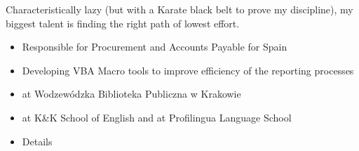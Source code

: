 \documentclass[10pt,a4paper]{../altacv}
\begin{document}

\begin{fullwidth}
\makecvheader
\end{fullwidth}

Characteristically lazy (but with a Karate black belt to prove my discipline), my biggest talent is finding the right path of lowest effort.
\medskip



\begin{itemize}
\item Responsible for Procurement and Accounts Payable for Spain
\item Developing VBA Macro tools to improve efficiency of the reporting processes
\end{itemize}

\divider

\begin{itemize}
\item at Wodzewódzka Biblioteka Publiczna w Krakowie
\item at K\&K School of English and at Profilingua Language School
\end{itemize}


\begin{itemize}
\item Details
\end{itemize}
\end{document}
